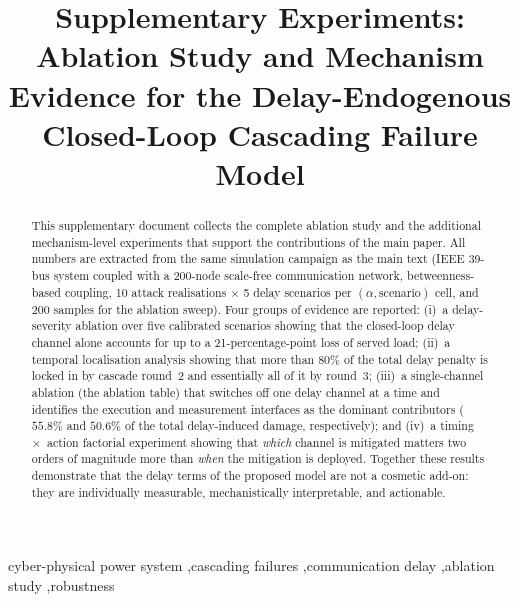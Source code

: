 \documentclass[a4paper,fleqn]{cas-dc}
\begin{document}
\let\WriteBookmarks\relax
\def\floatpagepagefraction{1}
\def\textpagefraction{.001}


\title[mode=title]{Supplementary Experiments: Ablation Study and Mechanism
Evidence for the Delay-Endogenous Closed-Loop Cascading Failure Model}

\begin{abstract}
This supplementary document collects the complete ablation study and the
additional mechanism-level experiments that support the contributions of the
main paper.  All numbers are extracted from the same simulation campaign as
the main text (IEEE 39-bus system coupled with a 200-node scale-free
communication network, betweenness-based coupling, 10 attack realisations
$\times$ 5 delay scenarios per $(\alpha,\text{scenario})$ cell, and 200
samples for the ablation sweep).  Four groups of evidence are reported:
(i)~a delay-severity ablation over five calibrated scenarios showing that
the closed-loop delay channel alone accounts for up to a 21-percentage-point
loss of served load; (ii)~a temporal localisation analysis showing that more
than $80\%$ of the total delay penalty is locked in by cascade round~2 and
essentially all of it by round~3; (iii)~a single-channel ablation
(the ablation table) that switches off one delay channel at a time and
identifies the execution and measurement interfaces as the dominant
contributors ($55.8\%$ and $50.6\%$ of the total delay-induced damage,
respectively); and (iv)~a timing~$\times$~action factorial experiment showing
that \emph{which} channel is mitigated matters two orders of magnitude more
than \emph{when} the mitigation is deployed.  Together these results
demonstrate that the delay terms of the proposed model are not a cosmetic
add-on: they are individually measurable, mechanistically interpretable, and
actionable.
\end{abstract}

\begin{keywords}
cyber-physical power system \sep cascading failures \sep communication
delay \sep ablation study \sep robustness
\end{keywords}

\maketitle
\end{document}
